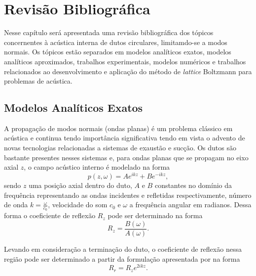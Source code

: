 \chapter{Revisão Bibliográfica}

Nesse capítulo será apresentada uma revisão bibliográfica dos tópicos concernentes à acústica interna de dutos circulares, limitamdo-se a modos normais. Os tópicos estão separados em modelos analíticos exatos, modelos analíticos aproximados, trabalhos experimentais, modelos numéricos e trabalhos relacionados ao desenvolvimento e aplicação do método de \textit{lattice} Boltzmann para problemas de acústica.

\section{Modelos Analíticos Exatos} 

A propagação de modos normais (ondas planas) é um problema clássico em acústica e continua tendo importância significativa tendo em vista o advento de novas tecnologias relacionadas a sistemas de exaustão e sucção. Os dutos são bastante presentes nesses sistemas e, para ondas planas que se propagam no eixo axial $z$, o campo acústico interno é modelado na forma
\begin{equation}
p(z,\omega) = Ae^{ikz} + Be^{-ikz}, 
\end{equation}   
sendo $z$ uma posição axial dentro do duto, $A$ e $B$ constantes no domínio da frequência representando as ondas incidentes e refletidas respectivamente, número de onda $k = \frac{\omega}{c_0}$, velocidade do som $c_{0}$ e $\omega$ a frequência angular em radianos. Dessa forma o coeficiente de reflexão $R_{z}$ pode ser determinado na forma
\begin{equation}
  R_{z} = \frac{B(\omega)}{A(\omega)}.
\end{equation}

Levando em consideração a terminação do duto, o coeficiente de reflexão nessa região pode ser determinado a partir da formulação apresentada por  na forma
\begin{equation}
  R_{r} = R_{z}e^{2ikz}.
\end{equation}

